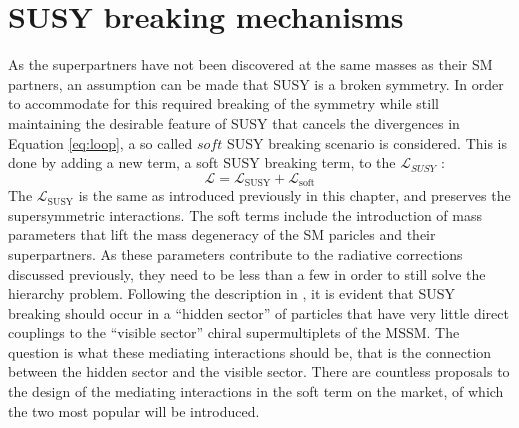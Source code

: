\section{SUSY breaking mechanisms}\label{sec:breaking}
\noindent\justify
As the superpartners have not been discovered at the same masses as their SM partners, an assumption can be made that SUSY is a broken symmetry. 
In order to accommodate for this required breaking of the symmetry while still maintaining the desirable feature of SUSY that cancels the divergences in Equation \ref{eq:loop}, a so called $soft$ SUSY breaking scenario is considered. 
This is done by adding a new term, a soft SUSY breaking term, to the $\mathcal{L}_{SUSY}$ \cite{soft,Chung:2003fi}:
\begin{equation}
\mathcal{L}=\mathcal{L}_{\mathrm{SUSY}}+\mathcal{L}_{\mathrm{soft}}
\label{eq:softterm}
\end{equation}
The $\mathcal{L}_{\mathrm{SUSY}}$ is the same as introduced previously in this chapter, and preserves the supersymmetric interactions. 
The soft terms include the introduction of mass parameters that lift the mass degeneracy of the SM paricles and their superpartners. 
As these parameters contribute to the radiative corrections discussed previously, they need to be less than a few \TeV in order to still solve the hierarchy problem. 
Following the description in \cite{Martin:1997ns}, it is evident that SUSY breaking should occur in a “hidden sector” of particles that have very little direct couplings to the “visible sector” chiral supermultiplets of the MSSM. 
The question is what these mediating interactions should be, that is the connection between the hidden sector and the visible sector. 
There are countless proposals to the design of the mediating interactions in the soft term on the market, of which the two most popular will be introduced. 
